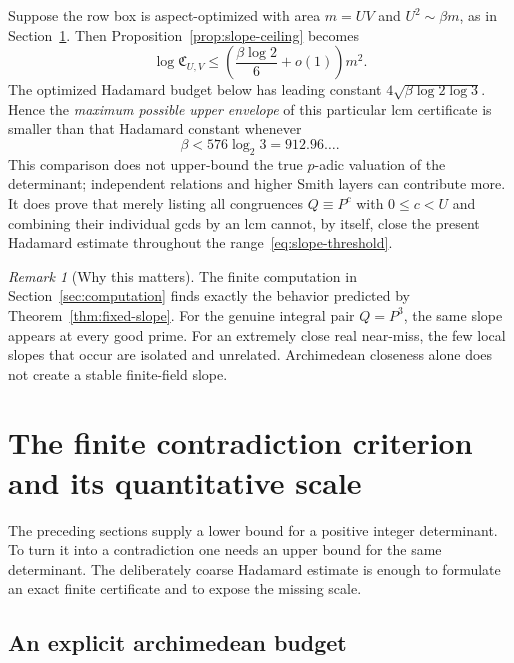 \documentclass[11pt]{article}
\theoremstyle{definition}
\theoremstyle{remark}
\newtheorem{remark}[theorem]{Remark}
\begin{document}
Suppose the row box is aspect-optimized with area $m=UV$ and
$U^2\sim\beta m$, as in Section~\ref{sec:closure}.  Then Proposition~\ref{prop:slope-ceiling} becomes
\begin{equation}
 \log \mathfrak C_{U,V}
 \le\left(\frac{\beta\log2}{6}+o(1)\right)m^2.
 \label{eq:slope-ceiling-optimized}
\end{equation}
The optimized Hadamard budget below has leading constant
$4\sqrt{\beta\log2\log3}$.  Hence the \emph{maximum possible upper envelope} of this particular lcm certificate is smaller than that Hadamard constant whenever
\begin{equation}
 \beta<576\log_2 3=912.96\ldots.
 \label{eq:slope-threshold}
\end{equation}
This comparison does not upper-bound the true $p$-adic valuation of the determinant; independent relations and higher Smith layers can contribute more.  It does prove that merely listing all congruences $Q\equiv P^c$ with $0\le c<U$ and combining their individual gcds by an lcm cannot, by itself, close the present Hadamard estimate throughout the range~\eqref{eq:slope-threshold}.

\begin{remark}[Why this matters]
The finite computation in Section~\ref{sec:computation} finds exactly the behavior predicted by Theorem~\ref{thm:fixed-slope}.  For the genuine integral pair $Q=P^3$, the same slope appears at every good prime.  For an extremely close real near-miss, the few local slopes that occur are isolated and unrelated.  Archimedean closeness alone does not create a stable finite-field slope.
\end{remark}

\section{The finite contradiction criterion and its quantitative scale}
\label{sec:closure}

The preceding sections supply a lower bound for a positive integer determinant.  To turn it into a contradiction one needs an upper bound for the same determinant.  The deliberately coarse Hadamard estimate is enough to formulate an exact finite certificate and to expose the missing scale.

\subsection{An explicit archimedean budget}
\end{document}
